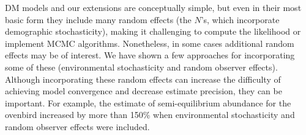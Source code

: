 \documentclass[12pt,english]{article}
\begin{document}
\begin{spacing}{1.9}
\begin{flushleft}
%

DM models and our extensions are conceptually simple, but even in
their most basic form they include many random effects (the $N$'s, which
incorporate demographic stochasticity), making it challenging to compute the likelihood 
or implement MCMC algorithms. Nonetheless, in some cases additional random effects
may be of interest.  We have shown a few approaches for incorporating some of these
(environmental stochasticity and random observer effects).  
Although incorporating these random effects can increase
the difficulty of achieving model convergence and decrease estimate precision, they can be important.
For example, the estimate of semi-equilibrium abundance for the ovenbird increased by more than 150\%
when environmental stochasticity and random observer effects were included.  


\end{flushleft}
\end{spacing}
\end{document}
